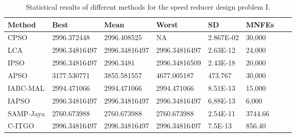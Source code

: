 
\begin{table*}[tp]
    \tiny
    \begin{center}
    
    \begin{tabular}{ P{2.0cm} P{2.0cm} P{2.0cm} P{2.0cm} P{2.0cm} P{2.0cm} P{2.0cm} P{2.0cm}  }
    \hline
    \textbf{Method} & \textbf{Best} & \textbf{Mean} & \textbf{Worst} & \textbf{SD} & \textbf{MNFEs} \\
    \hline
    
    CPSO & 2996.372448 & 2996.408525 & NA & 2.867E-02 & 30,000 \\
    LCA & 2996.34816497 & 2996.34816497 & 2996.34816497 & 2.63E-12 & 24,000 \\
    IPSO & 2996.34816497 & 2996.3481 & 2996.34816509 & 2.43E-18 & 20,000 \\
    APSO & 3177.530771 & 3855.581557 & 4677.005187 & 473.767 & 30,000 \\
    IABC-MAL & 2994.471066 & 2994.471066 & 2994.471066 & 8.51E-13 & 15,000 \\   
    IAPSO & 2996.34816497 & 2996.34816497 & 2996.34816497 & 6,88E-13 & 6,000 \\
    SAMP-Jaya & 2760.673988 & 2760.673988 & 2760.673988 & 2.54E-11 & 3744.66 \\    
    C-ITGO & 2996.34816497 & 2996.34816497 & 2996.34816497 & 7.5E-13 & 856.40 \\
        
    \hline
    \end{tabular}
    \end{center}
    \vspace*{-6mm}
    \caption{Statistical results of different methods for the speed reducer design problem I. \\[1em]}
    \label{tab:SP1}
    \end{table*}
    
    